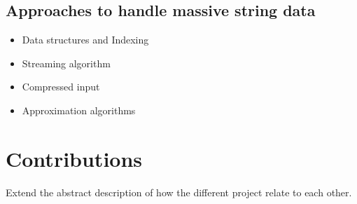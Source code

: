 \subsection{Approaches to handle massive string data}

\begin{itemize}
\item Data structures and Indexing
\item Streaming algorithm
\item Compressed input
\item Approximation algorithms
\end{itemize}

\section{Contributions}

Extend the abstract description of how the different project relate to each other.
